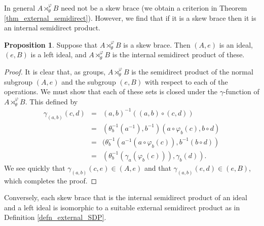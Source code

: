 \documentclass[12pt,a4paper, reqno]{amsart}
\theoremstyle{definition}
\newtheorem{proposition}[theorem]{Proposition}
\begin{document}
In general $ A \rtimes_{\theta}^{\varphi} B $ need not be a skew brace (we obtain a criterion in Theorem \ref{thm_external_semidirect}). However, we find that if it is a skew brace then it is an internal semidirect product. 

\begin{proposition} \label{prop_external_SDP_is_internal_SDP}
Suppose that $ A \rtimes_{\theta}^{\varphi} B $ is a skew brace. Then $ (A,e) $ is an ideal, $ (e,B) $ is a left ideal, and $ A \rtimes_{\theta}^{\varphi} B $ is the internal semidirect product of these. 
\end{proposition}
\begin{proof}
It is clear that, as groups, $ A \rtimes_{\theta}^{\varphi} B $ is the semidirect product of the normal subgroup $ (A,e) $ and the subgroup $ (e,B) $ with respect to each of the operations. We must show that each of these sets is closed under the $ \gamma $-function of $ A \rtimes_{\theta}^{\varphi} B $. This defined by
\begin{eqnarray*}
\gamma_{(a,b)}(c,d) & = & (a,b)^{-1} ( (a,b) \circ (c,d) ) \\
& = & (\theta_{b}^{-1}(a^{-1}), b^{-1}) (a \circ \varphi_{b}(c), b \circ d) \\
& = & (\theta_{b}^{-1}(a^{-1}(a \circ \varphi_{b}(c)), b^{-1}(b \circ d)) \\
& = & (\theta_{b}^{-1}(\gamma_{a}(\varphi_{b}(c))), \gamma_{b}(d)). 
\end{eqnarray*}
We see quickly that $ \gamma_{(a,b)}(c,e) \in (A,e) $ and that $ \gamma_{(a,b)}(e,d) \in (e,B) $, which completes the proof. 
\end{proof}

Conversely, each skew brace that is the internal semidirect product of an ideal and a left ideal is isomorphic to a suitable external semidirect product as in Definition \ref{defn_external_SDP}. 
\end{document}
